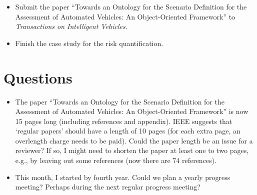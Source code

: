 \documentclass[10pt,final,a4paper,oneside,onecolumn]{article}
\begin{document}
%

\begin{itemize}
	\item Submit the paper ``Towards an Ontology for the Scenario Definition for the Assessment of Automated Vehicles: An Object-Oriented Framework'' to \emph{Transactions on Intelligent Vehicles}. 
	\item Finish the case study for the risk quantification.
\end{itemize}

\section{Questions}

\begin{itemize}
	\item The paper ``Towards an Ontology for the Scenario Definition for the Assessment of Automated Vehicles: An Object-Oriented Framework'' is now 15 pages long (including references and appendix). IEEE suggests that `regular papers' should have a length of 10 pages (for each extra page, an overlength charge needs to be paid). Could the paper length be an issue for a reviewer? If so, I might need to shorten the paper at least one to two pages, e.g., by leaving out some references (now there are 74 references).
	
	\item This month, I started by fourth year. Could we plan a yearly progress meeting? Perhaps during the next regular progress meeting?
\end{itemize}


\printbibliography

\clearpage


\end{document}

